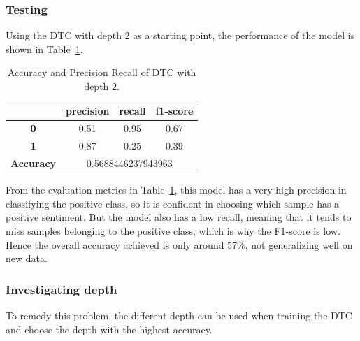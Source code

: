 \documentclass[a4paper]{report}
\begin{document}
{{\subsubsection{Testing}
Using the DTC with depth 2 as a starting point, the performance of the model is shown in Table~\ref{table:DTC_depth_2_performance}.
\\

\begin{table}[h]
\centering
\begin{tabular}{  c | c | c | c |}
\cline{2-4}
&  \textbf { precision } &  \textbf  { recall } & \textbf  { f1-score } \\
\hline
\multicolumn{1}{|c|}{\textbf{0}} & 0.51 & 0.95 & 0.67 \\
\hline
\multicolumn{1}{|c|}{\textbf{1}} &  0.87 & 0.25 & 0.39 \\
\hline
\hline
\multicolumn{1}{|c|}{\textbf{Accuracy}} & \multicolumn{3}{|c|}{0.5688446237943963} \\
\hline
\end{tabular}
\caption{Accuracy and Precision Recall of DTC with depth 2.}
\label{table:DTC_depth_2_performance}
\end{table}

\noindent
From the evaluation metrics in Table~\ref{table:DTC_depth_2_performance}, this model has a very high precision in classifying the positive class, so it is confident in choosing which sample has a positive sentiment. But the model also has a low recall, meaning that it tends to miss samples belonging to the positive class, which is why the F1-score is low. Hence the overall accuracy achieved is only around 57\%, not generalizing well on new data.

\subsubsection{Investigating depth}
To remedy this problem, the different depth can be used when training the DTC and choose the depth with the highest accuracy.

}}
\end{document}

